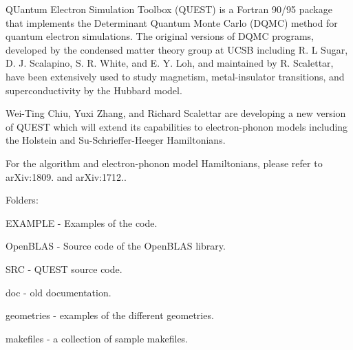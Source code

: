 QUantum Electron Simulation Toolbox (QUEST) is a Fortran 90/95 package that implements the Determinant Quantum Monte Carlo (DQMC) method for quantum electron simulations. The original versions of DQMC programs, developed by the condensed matter theory group at UCSB including R. L Sugar, D. J. Scalapino, S. R. White, and E. Y. Loh, and maintained by R. Scalettar, have been extensively used to study magnetism, metal-\/insulator transitions, and superconductivity by the Hubbard model.

Wei-\/\+Ting Chiu, Yuxi Zhang, and Richard Scalettar are developing a new version of QUEST which will extend its capabilities to electron-\/phonon models including the Holstein and Su-\/\+Schrieffer-\/\+Heeger Hamiltonians.

For the algorithm and electron-\/phonon model Hamiltonians, please refer to ar\+Xiv\+:1809. and ar\+Xiv\+:1712..

Folders\+:


\begin{DoxyItemize}
\item EXAMPLE -\/ Examples of the code.
\item Open\+BLAS -\/ Source code of the Open\+BLAS library.
\item SRC -\/ QUEST source code.
\item doc -\/ old documentation.
\item geometries -\/ examples of the different geometries.
\item makefiles -\/ a collection of sample makefiles. 
\end{DoxyItemize}